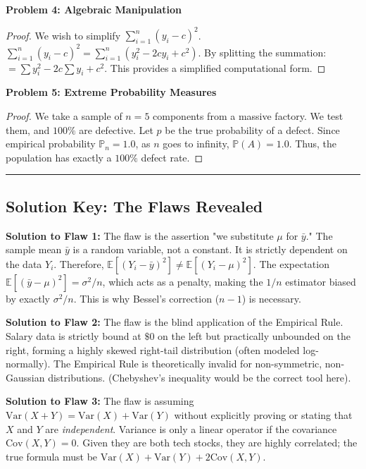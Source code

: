 \documentclass[11pt]{article}
\theoremstyle{definition}
\theoremstyle{remark}
\newcommand{\E}{\mathbb{E}}
\newcommand{\Prob}{\mathbb{P}}
\newcommand{\Var}{\text{Var}}
\newcommand{\samplemean}{\bar{y}}
\begin{document}
\textbf{Problem 4: Algebraic Manipulation}
\begin{proof}
We wish to simplify $\sum_{i=1}^n (y_i - c)^2$.
$\sum_{i=1}^n (y_i - c)^2 = \sum_{i=1}^n (y_i^2 - 2cy_i + c^2)$. 
By splitting the summation: 
$= \sum y_i^2 - 2c\sum y_i + c^2$. 
This provides a simplified computational form.
\end{proof}

\textbf{Problem 5: Extreme Probability Measures}
\begin{proof}
We take a sample of $n=5$ components from a massive factory. We test them, and $100\%$ are defective. Let $p$ be the true probability of a defect. Since empirical probability $\Prob_n = 1.0$, as $n$ goes to infinity, $\Prob(A) = 1.0$. Thus, the population has exactly a $100\%$ defect rate.
\end{proof}

\vspace{1cm}
\hrule
\vspace{0.5cm}

\subsection{Solution Key: The Flaws Revealed}

\textbf{Solution to Flaw 1:}
The flaw is the assertion "we substitute $\mu$ for $\samplemean$." The sample mean $\samplemean$ is a random variable, not a constant. It is strictly dependent on the data $Y_i$. Therefore, $\E[(Y_i - \samplemean)^2] \neq \E[(Y_i - \mu)^2]$. The expectation $\E[(\samplemean - \mu)^2] = \sigma^2/n$, which acts as a penalty, making the $1/n$ estimator biased by exactly $\sigma^2/n$. This is why Bessel's correction ($n-1$) is necessary.

\textbf{Solution to Flaw 2:}
The flaw is the blind application of the Empirical Rule. Salary data is strictly bound at $\$0$ on the left but practically unbounded on the right, forming a highly skewed right-tail distribution (often modeled log-normally). The Empirical Rule is theoretically invalid for non-symmetric, non-Gaussian distributions. (Chebyshev's inequality would be the correct tool here).

\textbf{Solution to Flaw 3:}
The flaw is assuming $\Var(X+Y) = \Var(X) + \Var(Y)$ without explicitly proving or stating that $X$ and $Y$ are \textit{independent}. Variance is only a linear operator if the covariance $\text{Cov}(X,Y) = 0$. Given they are both tech stocks, they are highly correlated; the true formula must be $\Var(X) + \Var(Y) + 2\text{Cov}(X,Y)$.
\end{document}
